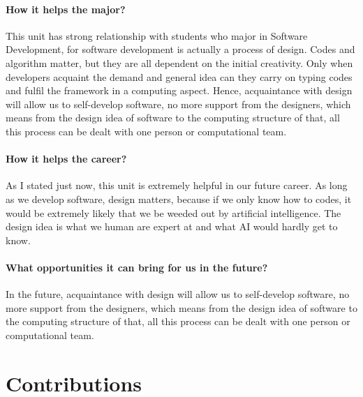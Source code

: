 \documentclass[12pt, a4paper]{article}
\begin{document}
	\paragraph {How it helps the major?}

This unit has strong relationship with students who major in Software Development, for software development is actually a process of design. Codes and algorithm matter, but they are all dependent on the initial creativity. Only when developers acquaint the demand and general idea can they carry on typing codes and fulfil the framework in a computing aspect. Hence, acquaintance with design will allow us to self-develop software, no more support from the designers, which means from the design idea of software to the computing structure of that, all this process can be dealt with one person or computational team.

	\paragraph {How it helps the career?}

As I stated just now, this unit is extremely helpful in our future career. As long as we develop software, design matters, because if we only know how to codes, it would be extremely likely that we be weeded out by artificial intelligence. The design idea is what we human are expert at and what AI would hardly get to know.

	\paragraph {What opportunities it can bring for us in the future?}

In the future, acquaintance with design will allow us to self-develop software, no more support from the designers, which means from the design idea of software to the computing structure of that, all this process can be dealt with one person or computational team.

	\clearpage

	\section{Contributions}

	\clearpage
	

	
	
	
\end{document}
